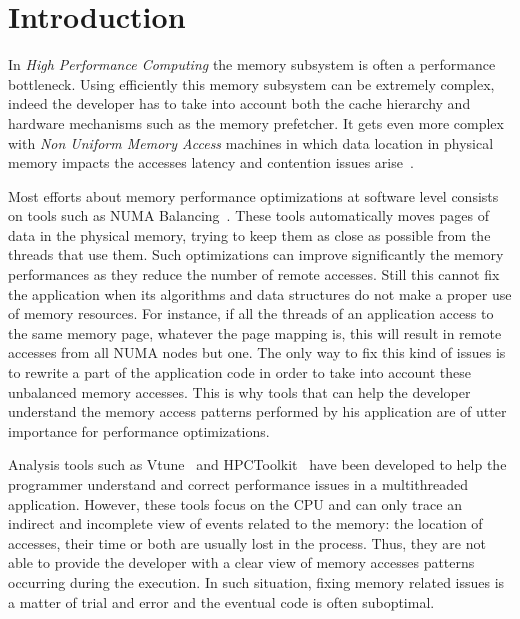 \section{Introduction}
\label{sec:intro}

In \emph{High Performance Computing} the memory subsystem is often a performance bottleneck.
Using efficiently this memory subsystem can be extremely
complex, indeed the developer has to take into account both the cache hierarchy and
hardware mechanisms such as the memory prefetcher. It gets even more complex with
\emph{Non Uniform Memory Access} machines in which data location in
physical memory impacts the accesses latency and contention issues arise~\cite{Drepper07What}.

Most efforts about memory performance optimizations at software level consists
on tools such as NUMA Balancing~\cite{Corbet2012}.
These tools automatically moves pages of data in the physical memory, trying
to keep them as close as possible from the threads that use them. Such
optimizations can improve significantly the memory performances as they reduce
the number of remote accesses. Still this cannot fix the application when its algorithms and data structures do not make a proper use of memory resources.
For instance, if all the
threads of an application access to the same memory page, whatever the page mapping is,
this will result in remote accesses from all NUMA nodes but one. The only way to fix
this kind of issues is to rewrite a part of the application code in order to take into account these
unbalanced memory accesses. This is why tools that can help the developer understand the memory access patterns
performed by his application are of utter importance for performance optimizations.

Analysis tools such as Vtune~\cite{Reinders05VTune} and
HPCToolkit~\cite{Adhianto10HPCTOOLKIT} have been developed to help the programmer
understand and correct performance issues in a multithreaded application. However, these tools
focus on the CPU and can only trace an indirect and incomplete view of events related to the memory: the location of accesses,
their time or both are usually lost in the process. Thus, they are not able to provide the developer with
a clear view of memory accesses patterns occurring during the execution. In such situation, fixing
memory related issues is a matter of trial and error and the eventual code is often suboptimal.

